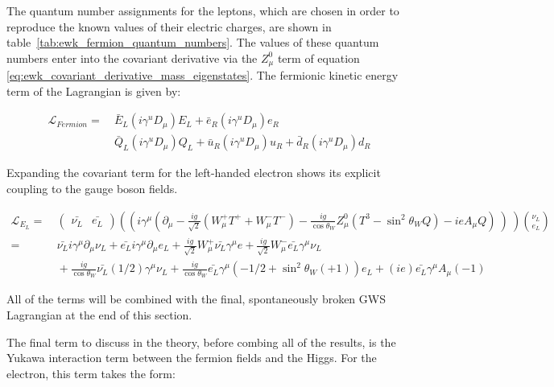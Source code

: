 \noindent The quantum number assignments for the leptons, which are
chosen in order to reproduce the known values of their electric
charges, are shown in table~\ref{tab:ewk_fermion_quantum_numbers}.
The values  of these quantum numbers enter into the covariant
derivative via the  $Z_{\mu}^{0}$ term of equation
\ref{eq:ewk_covariant_derivative_mass_eigenstates}.  The fermionic
kinetic energy term of the Lagrangian is given by:

\begin{equation}\label{eq:ewk_fermionic_lagrangian_term}
\begin{aligned}
\mathcal{L}_{Fermion} =&~ \bar{E}_{L}(i\gamma^{u}D_{\mu})E_{L} +
\bar{e}_{R}(i\gamma^{u}D_{\mu})e_{R} \\
&~ \bar{Q}_{L}(i\gamma^{u}D_{\mu})Q_{L} +
\bar{u}_{R}(i\gamma^{u}D_{\mu})u_{R} +
\bar{d}_{R}(i\gamma^{u}D_{\mu})d_{R}
\end{aligned}
\end{equation} 

\noindent Expanding the covariant term for the left-handed electron
shows its explicit coupling to the gauge boson fields. 

\begin{equation}\label{eq:ewk_eLeft_lagrangian_term}
\begin{aligned}
\mathcal{L}_{E_{L}} =&~ 
\begin{pmatrix}
  \bar{\nu_{L}} & \bar{e_{L}} 
\end{pmatrix}
\left( (i\gamma^{\mu}(\partial_{\mu} -
  \frac{ig}{\sqrt{2}}(W_{\mu}^{+}T^{+} + W_{\mu}^{-}T^{-}) -
  \frac{ig}{\cos{\theta_{W}}}Z_{\mu}^{0}(T^{3}-\sin^{2}{\theta_{W}}Q)
  - ieA_{\mu}Q)~)~\right)\binom{\nu_{L}}{e_{L}} \\
=&~\bar{\nu_{L}}i\gamma^{\mu}\partial_{\mu}\nu_{L} +
\bar{e_{L}}i\gamma^{\mu}\partial_{\mu}e_{L}
+\frac{ig}{\sqrt{2}}W_{\mu}^{+}\bar{\nu_{L}}\gamma^{\mu}e +
\frac{ig}{\sqrt{2}}W_{\mu}^{-}\bar{e_{L}}\gamma^{\mu}\nu_{L} \\
&~+\frac{ig}{\cos{\theta_{W}}}\bar{\nu_{L}}(1/2)\gamma^{\mu}\nu_{L} +
\frac{ig}{\cos{\theta_{W}}}\bar{e_{L}}\gamma^{\mu}(-1/2 +
\sin^{2}{\theta_{W}}(+1))e_{L} + (ie)\bar{e_{L}}\gamma^{\mu}A_{\mu}(-1)
\end{aligned}
\end{equation}

\noindent All of the terms will be combined with the final,
spontaneously broken GWS Lagrangian at the end of this section.  

\par The final term to discuss in the theory, before combing all of
the results, is the Yukawa interaction term between the fermion fields
and the Higgs.  For the electron, this term takes the form:

